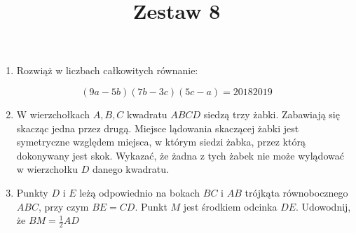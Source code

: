 \documentclass[10pt]{article}
\title{Zestaw 8 }
\author{}
\date{}
\begin{document}
\maketitle
\begin{enumerate}
  \item Rozwiąż w liczbach całkowitych równanie:
\end{enumerate}

\[
(9 a-5 b)(7 b-3 c)(5 c-a)=20182019
\]

\begin{enumerate}
  \setcounter{enumi}{1}
  \item W wierzchołkach \(A, B, C\) kwadratu \(A B C D\) siedzą trzy żabki. Zabawiają się skacząc jedna przez drugą. Miejsce lądowania skaczącej żabki jest symetryczne względem miejsca, w którym siedzi żabka, przez którą dokonywany jest skok. Wykazać, że żadna z tych żabek nie może wylądować w wierzchołku \(D\) danego kwadratu.
  \item Punkty \(D\) i \(E\) leżą odpowiednio na bokach \(B C\) i \(A B\) trójkąta równobocznego \(A B C\), przy czym \(B E=C D\). Punkt \(M\) jest środkiem odcinka \(D E\). Udowodnij, że \(B M=\frac{1}{2} A D\)
\end{enumerate}
\end{document}
